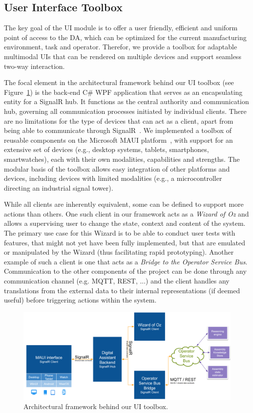 \subsection{User Interface Toolbox}\label{sec:UI}
The key goal of the UI module is to offer a user friendly, efficient and uniform point of access to the DA, which can be optimized for the current manufacturing environment, task and operator. Therefor, we provide a toolbox for adaptable multimodal UIs that can be rendered on multiple devices and support seamless two-way interaction.

The focal element in the architectural framework behind our UI toolbox (see Figure~\ref{fig:ui-architecture}) is the back-end C\# WPF application that serves as an encapsulating entity for a SignalR hub. It functions as the central authority and communication hub, governing all communication processes initiated by individual clients. There are no limitations for the type of devices that can act as a client, apart from being able to communicate through SignalR~\cite{SignalR01,Sharma_2023}. We implemented a toolbox of reusable components on the Microsoft MAUI platform~\cite{Maui01,Maui02}, with support for an extensive set of devices (e.g., desktop systems, tablets, smartphones, smartwatches), each with their own modalities, capabilities and strengths. The modular basis of the toolbox allows easy integration of other platforms and devices, including devices with limited modalities (e.g., a microcontroller directing an industrial signal tower).

While all clients are inherently equivalent, some can be defined to support more actions than others. One such client in our framework acts as a \emph{Wizard of Oz} and allows a supervising user to change the state, context and content of the system. The primary use case for this Wizard is to be able to conduct user tests with features, that might not yet have been fully implemented, but that are emulated or manipulated by the Wizard (thus facilitating rapid prototyping).
Another example of such a client is one that acts as a \emph{Bridge to the Operator Service Bus}. Communication to the other components of the project can be done through any communication channel (e.g. MQTT, REST, ...) and the client handles any translations from the external data to their internal representations (if deemed useful) before triggering actions within the system.

\begin{figure}
    \centering
    \includegraphics[width=1\linewidth]{figs/UI-architecture.png}
    \caption{Architectural framework behind our UI toolbox.}
    \label{fig:ui-architecture}
\end{figure}


